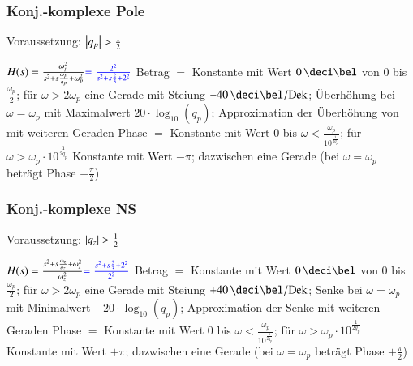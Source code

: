 \begin{minipage}[t]{0.48\columnwidth}
    \raggedright
    \subsubsection{Konj.-komplexe Pole}

    Voraussetzung: $\left|q_p\right| > \frac{1}{2}$

    \begin{outline}
        \1 $H(s) = \frac{\omega_p^2}{s^2 + s \frac{\omega_p}{q_p} + \omega_p^2} {\color{blue}= \frac{2^2}{s^2 + s \frac{2}{3} + 2^2}}$
            \2 Betrag $=$ Konstante mit Wert $0 \, \deci \bel$ von $0$ bis $\frac{\omega_p}{2}$; 
                für $\omega > 2\omega_p$ eine Gerade mit Steiung $- 40 \, \deci \bel / \Dek$; 
                Überhöhung bei $\omega = \omega_p$ mit Maximalwert $20 \cdot \log_{10}(q_p)$;
                Approximation der Überhöhung von mit weiteren Geraden
            \2 Phase $=$ Konstante mit Wert $0$ bis $\omega < \frac{\omega_p}{10^{\frac{1}{2 q_p}}}$; 
                für $\omega > \omega_p \cdot 10^{\frac{1}{2 q_p}}$  Konstante mit Wert $-\pi$; dazwischen eine Gerade
                (bei $\omega = \omega_p$ beträgt Phase $- \frac{\pi}{2}$)
    \end{outline}
\end{minipage}
\begin{minipage}[t]{0.48\columnwidth}
    \raggedright
    \subsubsection{Konj.-komplexe NS} 

    Voraussetzung: $\left|q_z\right| > \frac{1}{2}$

    \begin{outline}
        \1 $H(s) = \frac{s^2 + s \frac{\omega_z}{q_z} + \omega_z^2}{\omega_z^2} {\color{blue}= \frac{s^2 + s \frac{2}{3} + 2^2}{2^2}}$
            \2 Betrag $=$ Konstante mit Wert $0 \, \deci \bel$ von $0$ bis $\frac{\omega_p}{2}$; 
                für $\omega > 2\omega_p$ eine Gerade mit Steiung $+ 40 \, \deci \bel / \Dek$; 
                Senke bei $\omega = \omega_p$ mit Minimalwert $-20 \cdot \log_{10}(q_p)$;
                Approximation der Senke mit weiteren Geraden
            \2 Phase $=$ Konstante mit Wert $0$ bis $\omega < \frac{\omega_p}{10^{\frac{1}{2 q_p}}}$; 
                für $\omega > \omega_p \cdot 10^{\frac{1}{2 q_p}}$  Konstante mit Wert $+\pi$; dazwischen eine Gerade
                (bei $\omega = \omega_p$ beträgt Phase $+ \frac{\pi}{2}$)
    \end{outline}

\end{minipage}


